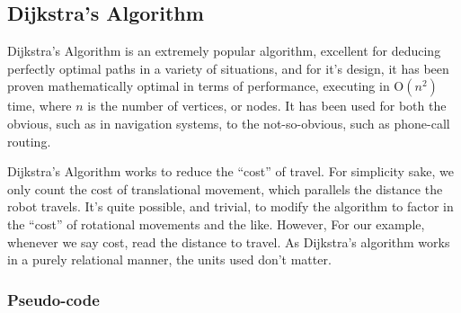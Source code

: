 \documentclass[letterpaper, 12pt]{article}
\begin{document}
\begin{multicols}{2}
\subsection{Dijkstra's Algorithm}

Dijkstra's Algorithm is an extremely popular algorithm, excellent for deducing
perfectly optimal paths in a variety of situations, and for it's design, it has
been proven mathematically optimal in terms of performance, executing in
\(\mathrm{O}\left(n^2\right)\) time, where \(n\) is the number of vertices, or
nodes. It has been used for both the obvious, such as in navigation systems, to
the not-so-obvious, such as phone-call routing.

Dijkstra's Algorithm works to reduce the ``cost'' of travel. For simplicity
sake, we only count the cost of translational movement, which parallels the
distance the robot travels. It's quite possible, and trivial, to modify the
algorithm to factor in the ``cost'' of rotational movements and the like.
However, For our example, whenever we say cost, read the distance to travel. As
Dijkstra's algorithm works in a purely relational manner, the units used don't
matter.

\subsubsection{Pseudo-code}


\end{multicols}
\end{document}
